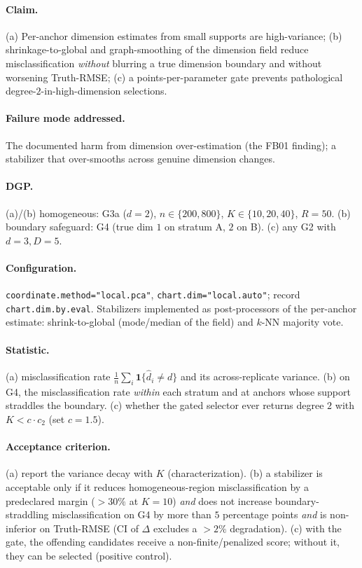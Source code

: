 \documentclass[11pt]{article}
\newcommand{\code}[1]{\texttt{#1}}
\begin{document}
\paragraph{Claim.} (a) Per-anchor dimension estimates from small supports are high-variance;
(b) shrinkage-to-global and graph-smoothing of the dimension field reduce misclassification
\emph{without} blurring a true dimension boundary and without worsening Truth-RMSE; (c) a
points-per-parameter gate prevents pathological degree-$2$-in-high-dimension selections.

\paragraph{Failure mode addressed.} The documented harm from dimension over-estimation
(the FB01 finding); a stabilizer that over-smooths across genuine dimension changes.

\paragraph{DGP.} (a)/(b) homogeneous: G3a ($d=2$), $n\in\{200,800\}$, $K\in\{10,20,40\}$, $R=50$.
(b) boundary safeguard: G4 (true dim $1$ on stratum A, $2$ on B). (c) any G2 with $d=3,D=5$.

\paragraph{Configuration.} \code{coordinate.method="local.pca"}, \code{chart.dim="local.auto"};
record \code{chart.dim.by.eval}. Stabilizers implemented as post-processors of the per-anchor
estimate: shrink-to-global (mode/median of the field) and $k$-NN majority vote.

\paragraph{Statistic.} (a) misclassification rate $\frac1n\sum_i\mathbf{1}\{\hat d_i\ne d\}$
and its across-replicate variance. (b) on G4, the misclassification rate \emph{within} each
stratum and at anchors whose support straddles the boundary. (c) whether the gated selector
ever returns degree $2$ with $K<c\cdot c_2$ (set $c=1.5$).

\paragraph{Acceptance criterion.} (a) report the variance decay with $K$ (characterization).
(b) a stabilizer is acceptable only if it reduces homogeneous-region misclassification by a
predeclared margin ($>30\%$ at $K=10$) \emph{and} does not increase boundary-straddling
misclassification on G4 by more than $5$ percentage points \emph{and} is non-inferior on
Truth-RMSE (CI of $\Delta$ excludes a $>2\%$ degradation). (c) with the gate, the offending
candidates receive a non-finite/penalized score; without it, they can be selected (positive
control).
\end{document}
